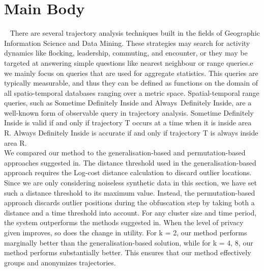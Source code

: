 \section{Main Body}~\label{sec:literature}
There are several trajectory analysis techniques built in the fields of Geographic Information Science and Data Mining. These strategies may search for activity dynamics like flocking, leadership, commuting, and encounter, or they may be targeted at answering simple questions like nearest neighbour or range queries.e we mainly focus on queries that are used for aggregate statistics. This queries are typically measurable, and thus they can be defined as functions
on the domain of all spatio-temporal databases ranging over a metric space.
Spatial-temporal range queries, such as Sometime Definitely Inside and Always Definitely Inside, are a well-known form of observable query in trajectory analysis. Sometime Definitely Inside is valid if and only if trajectory T occurs at a time when it is inside area R. Always Definitely Inside is accurate if and only if trajectory T is always inside area R.\\
We compared our method to the generalisation-based and permutation-based approaches suggested in. The distance threshold used in the generalisation-based approach requires the Log-cost distance calculation to discard outlier locations. Since we are only considering noiseless synthetic data in this section, we have set such a distance threshold to its maximum value. Instead, the permutation-based approach discards outlier positions during the obfuscation step by taking both a distance and a time threshold into account. For any cluster size and time period, the system outperforms the methods suggested in. When the level of privacy given improves, so does the change in utility. For k = 2, our method performs marginally better than the generalisation-based solution, while for k = 4, 8, our method performs substantially better. This ensures that our method effectively groups and anonymizes trajectories.
